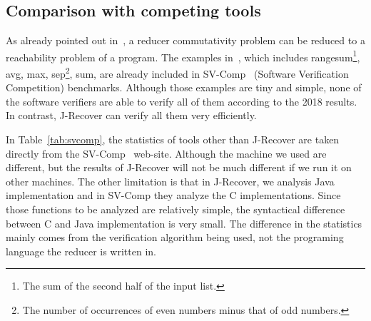 \documentclass{llncs}
\begin{document}
\subsection{Comparison with competing tools}
As already pointed out in~\cite{ChenHSW15}, a reducer commutativity problem can be reduced to a reachability problem of a program. 
The examples in~\cite{ChenHSW15}, which includes \textsf{rangesum}\footnote{The sum of the second half of the input list.}, \textsf{avg}, \textsf{max}, \textsf{sep}\footnote{The number of occurrences of even numbers minus that of odd numbers.}, \textsf{sum}, are already included in SV-Comp~\cite{svcomp} (Software Verification Competition) benchmarks.
Although those examples are tiny and simple, none of the software verifiers are able to verify all of them according to the 2018 results. In contrast, J-Recover can verify all them very efficiently. 

In Table~\ref{tab:svcomp}, the statistics of tools other than J-Recover are taken directly from the SV-Comp~\cite{svcomp} web-site. Although the machine we used are different, but the results of J-Recover will not be much different if we run it on other machines. The other limitation is that in J-Recover, we analysis Java implementation and in SV-Comp they analyze the C implementations. Since those functions to be analyzed are relatively simple, the syntactical difference between C and Java implementation is very small. The difference in the statistics mainly comes from the verification algorithm being used, not the programing language the reducer is written in.
\begin{table}[t]
	\caption{SV-Comp 2018 results on reducer commutativity. For space reason, we only list results of competitive tool in this table, which includes top three tools in the overall ranking and the reachability safety category.}
	\label{tab:svcomp}
\end{table}
\end{document}
